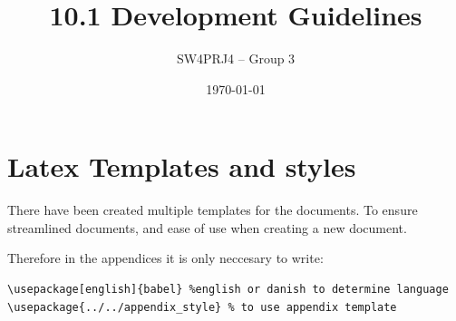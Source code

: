 \documentclass[a4paper,11pt]{article}
\title{10.1 Development Guidelines}
\author{SW4PRJ4 -- Group 3}
\date{\today}
\begin{document}
\maketitle

\section{Latex Templates and styles}
There have been created multiple templates for the documents. To ensure streamlined documents, and ease of use when creating a new document. 

Therefore in the appendices it is only neccesary to write:
\begin{lstlisting}[language={[LaTeX]TeX}]
\usepackage[english]{babel} %english or danish to determine language
\usepackage{../../appendix_style} % to use appendix template
\end{lstlisting}


\end{document}
